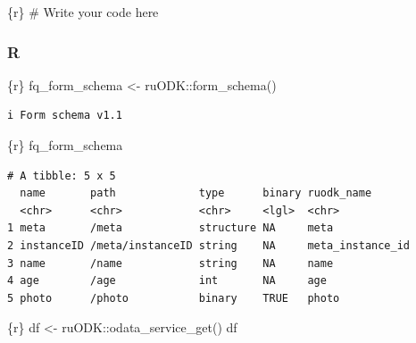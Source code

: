 \documentclass[
  letterpaper,
  DIV=11,
  numbers=noendperiod]{scrreprt}
\newenvironment{Shaded}{\begin{snugshade}}{\end{snugshade}}
\newcommand{\CommentTok}[1]{\textcolor[rgb]{0.37,0.37,0.37}{#1}}
\newcommand{\FunctionTok}[1]{\textcolor[rgb]{0.28,0.35,0.67}{#1}}
\newcommand{\InformationTok}[1]{\textcolor[rgb]{0.37,0.37,0.37}{#1}}
\newcommand{\NormalTok}[1]{\textcolor[rgb]{0.00,0.23,0.31}{#1}}
\newcommand{\OtherTok}[1]{\textcolor[rgb]{0.00,0.23,0.31}{#1}}
\newcommand{\SpecialCharTok}[1]{\textcolor[rgb]{0.37,0.37,0.37}{#1}}
\begin{document}
\begin{Shaded}
\begin{Highlighting}[]
\InformationTok{\textasciigrave{}\textasciigrave{}\textasciigrave{}\{r\}}
\CommentTok{\# Write your code here}
\InformationTok{\textasciigrave{}\textasciigrave{}\textasciigrave{}}
\end{Highlighting}
\end{Shaded}

\hypertarget{r-5}{%
\subsubsection{R}\label{r-5}}

\begin{Shaded}
\begin{Highlighting}[]
\InformationTok{\textasciigrave{}\textasciigrave{}\textasciigrave{}\{r\}}
\NormalTok{fq\_form\_schema }\OtherTok{\textless{}{-}}\NormalTok{ ruODK}\SpecialCharTok{::}\FunctionTok{form\_schema}\NormalTok{()}
\InformationTok{\textasciigrave{}\textasciigrave{}\textasciigrave{}}
\end{Highlighting}
\end{Shaded}

\begin{verbatim}
i Form schema v1.1
\end{verbatim}

\begin{Shaded}
\begin{Highlighting}[]
\InformationTok{\textasciigrave{}\textasciigrave{}\textasciigrave{}\{r\}}
\NormalTok{fq\_form\_schema}
\InformationTok{\textasciigrave{}\textasciigrave{}\textasciigrave{}}
\end{Highlighting}
\end{Shaded}

\begin{verbatim}
# A tibble: 5 x 5
  name       path             type      binary ruodk_name      
  <chr>      <chr>            <chr>     <lgl>  <chr>           
1 meta       /meta            structure NA     meta            
2 instanceID /meta/instanceID string    NA     meta_instance_id
3 name       /name            string    NA     name            
4 age        /age             int       NA     age             
5 photo      /photo           binary    TRUE   photo           
\end{verbatim}

\begin{Shaded}
\begin{Highlighting}[]
\InformationTok{\textasciigrave{}\textasciigrave{}\textasciigrave{}\{r\}}
\NormalTok{df }\OtherTok{\textless{}{-}}\NormalTok{ ruODK}\SpecialCharTok{::}\FunctionTok{odata\_service\_get}\NormalTok{()}
\NormalTok{df}
\InformationTok{\textasciigrave{}\textasciigrave{}\textasciigrave{}}
\end{Highlighting}
\end{Shaded}
\end{document}
